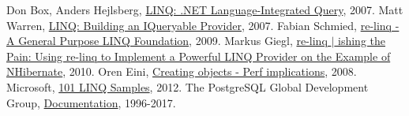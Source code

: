 
 Don Box, Anders Hejlsberg, \href{https://msdn.microsoft.com/en-us/library/bb308959.aspx}{LINQ: .NET Language-Integrated Query}, 2007.
 Matt Warren, \href{https://blogs.msdn.microsoft.com/mattwar/2007/07/30/linq-building-an-iqueryable-provider-part-i/}{LINQ: Building an IQueryable Provider}, 2007.
 Fabian Schmied, \href{https://www.re-motion.org/download/re-linq.pdf}{re-linq - A General Purpose LINQ Foundation}, 2009.
 Markus Giegl, \href{https://www.codeproject.com/Articles/42059/re-linq-ishing-the-Pain-Using-re-linq-to-Implement}{re-linq $\vert$ ishing the Pain: Using re-linq to Implement a Powerful LINQ Provider on the Example of NHibernate}, 2010.
 Oren Eini, \href{https://ayende.com/blog/3167/creating-objects-perf-implications}{Creating objects - Perf implications}, 2008.
 Microsoft, \href{https://code.msdn.microsoft.com/101-LINQ-Samples-3fb9811b}{101 LINQ Samples}, 2012.
 The PostgreSQL Global Development Group, \href{https://www.postgresql.org/docs/}{Documentation}, 1996-2017.